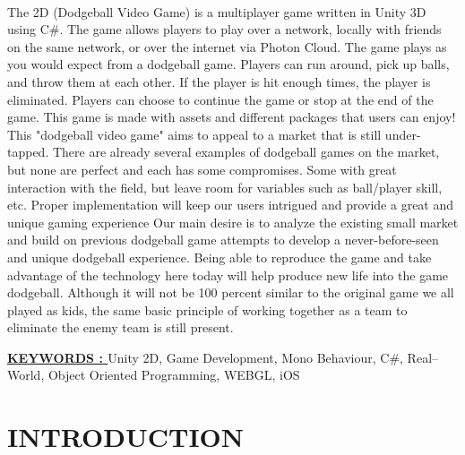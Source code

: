 \documentclass[12pt]{report}
\begin{document}
\vspace{4 cm}
\\
\vspace{1 cm}
\justifying
\setlength{\parindent}{4em}
\setlength{\parskip}{1em}
\renewcommand{\baselinestretch}{1.5}
\normalsize
The 2D (Dodgeball Video Game) is a multiplayer game written in Unity 3D using C\#. The game allows players to play over a network, locally with friends on the same network, or over the internet via Photon Cloud. The game plays as you would expect from a dodgeball game. Players can run around, pick up balls, and throw them at each other. If the player is hit enough times, the player is eliminated. Players can choose to continue the game or stop at the end of the game. This game is made with assets and different packages that users can enjoy! This "dodgeball video game" aims to appeal to a market that is still under-tapped. There are already several examples of dodgeball games on the market, but none are perfect and each has some compromises. Some with great interaction with the field, but leave room for variables such as ball/player skill, etc. Proper implementation will keep our users intrigued  and provide a great and unique gaming experience Our main desire is to analyze the existing small market and build on previous dodgeball game attempts to develop a never-before-seen and unique dodgeball experience. Being able to reproduce the game and take advantage of the technology here today will help produce new life into the game dodgeball. Although it will not be 100 percent similar to the original game we all played as kids, the same basic principle of working together as a team to eliminate the enemy team is still present.

\raggedright{ \textbf \underline{KEYWORDS : }}Unity 2D, Game Development, Mono Behaviour, C\#, Real–World, Object Oriented Programming, WEBGL, iOS

\clearpage



\tableofcontents
\clearpage

\listoffigures
\thispagestyle{empty}

\clearpage
{}

\fancyhead[R]{\thepage}

\centering
\section{INTRODUCTION}
\raggedright
\end{document}
